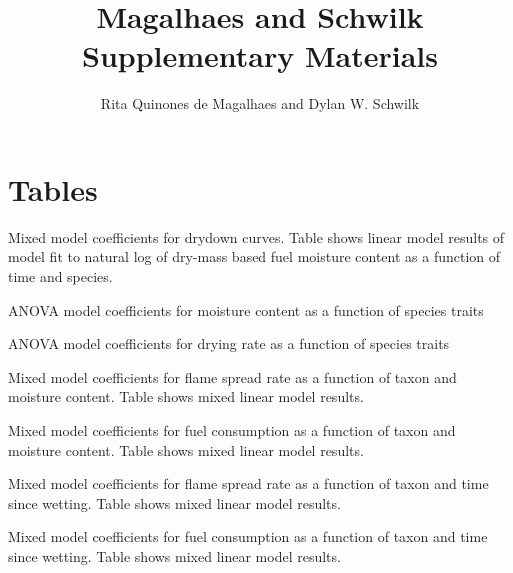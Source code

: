 \documentclass[letterpaper]{article}
\title{Magalhaes and Schwilk Supplementary Materials}
\author{Rita Quinones de Magalhaes and Dylan W. Schwilk}
\date{}
\begin{document}
\maketitle

\section{Tables}

\begin{table}[H]
  \caption{Mixed model coefficients for drydown curves. Table shows linear model results of model fit to  natural log of dry-mass based fuel moisture content as a function of time and species.} 
  \label{tabS1}
\centering

\end{table}

\begin{table}[H]
  \caption{ANOVA model coefficients for moisture content as a function of species traits} 
  \label{tabS2}
\centering

\end{table}

\begin{table}[H]
  \caption{ANOVA model coefficients for drying rate as a function of species traits} 
  \label{tabS3}
\centering

\end{table}

\begin{table}[H]
  \caption{Mixed model coefficients for flame spread rate as a function of taxon and moisture content. Table shows mixed linear model results.} 
  \label{tabS4}
\centering

\end{table}

\begin{table}[H]
  \caption{Mixed model coefficients for fuel consumption as a function of taxon and moisture content. Table shows mixed linear model results.} 
  \label{tabS5}
\centering

\end{table}


\begin{table}[H]
  \caption{Mixed model coefficients for flame spread rate as a function of taxon and time since wetting. Table shows mixed linear model results.} 
  \label{tabS6}
\centering

\end{table}

\begin{table}[H]
  \caption{Mixed model coefficients for fuel consumption as a function of taxon and time since wetting. Table shows mixed linear model results.} 
  \label{tabS6}
\centering

\end{table}
\end{document}
